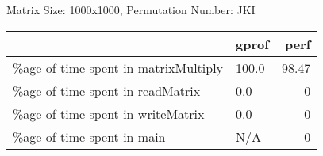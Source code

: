 \documentclass{article}
\begin{document}
    Matrix Size: 1000x1000, Permutation Number: JKI \\
    \begin{tabular}{llr}
\hline
                                      & gprof   &   perf \\
\hline
 \%age of time spent in matrixMultiply & 100.0   &  98.47 \\
 \%age of time spent in readMatrix     & 0.0     &   0    \\
 \%age of time spent in writeMatrix    & 0.0     &   0    \\
 \%age of time spent in main           & N/A     &   0    \\
\hline
\end{tabular}
    
\end{document}
